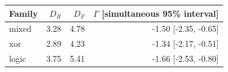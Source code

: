 \begin{tabular}{lrrr}
\toprule
Family & $D_R$ & $D_F$ & $\Gamma$ [simultaneous 95\% interval] \\
\midrule
mixed & 3.28 & 4.78 & -1.50 [-2.35, -0.65] \\
xor & 2.89 & 4.23 & -1.34 [-2.17, -0.51] \\
logic & 3.75 & 5.41 & -1.66 [-2.53, -0.80] \\
\bottomrule
\end{tabular}
